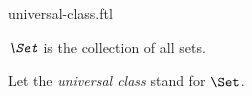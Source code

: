 \documentclass{stex}
\begin{document}
\begin{smodule}{universal-class.ftl}

\begin{definition}[forthel,id=FOUNDATIONS_10_9625487120366325]
  $\emph{\Set}$ is the collection of all sets.

  Let the \emph{universal class} stand for $\Set$.
\end{definition}
\end{smodule}
\end{document}
